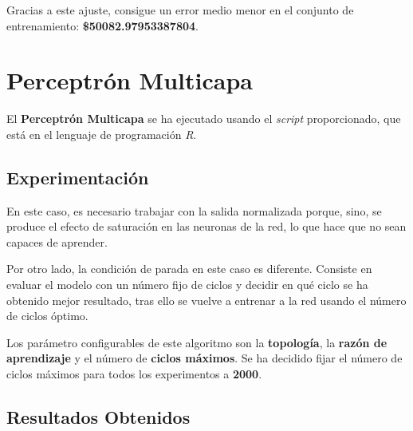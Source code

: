 \documentclass{uc3mpracticas}
\begin{document}
      Gracias a este ajuste, consigue un error medio menor en el conjunto de entrenamiento: \textbf{\$50082.97953387804}.

  \section{Perceptrón Multicapa}

  El \textbf{Perceptrón Multicapa} se ha ejecutado usando el \textit{script} proporcionado, que está en el lenguaje de programación \textit{R}.


    \subsection{Experimentación}

    En este caso, es necesario trabajar con la salida normalizada porque, sino, se produce el efecto de saturación en las neuronas de la red, lo que hace que no sean capaces de aprender.

    \vspace{2mm}

    Por otro lado, la condición de parada en este caso es diferente. Consiste en evaluar el modelo con un número fijo de ciclos y decidir en qué ciclo se ha obtenido mejor resultado, tras ello se vuelve a entrenar a la red usando el número de ciclos óptimo.

    \vspace{2mm}

    Los parámetro configurables de este algoritmo son la \textbf{topología}, la \textbf{razón de aprendizaje} y el número de \textbf{ciclos máximos}. Se ha decidido fijar el número de ciclos máximos para todos los experimentos a \textbf{2000}.


    \subsection{Resultados Obtenidos}
\end{document}
